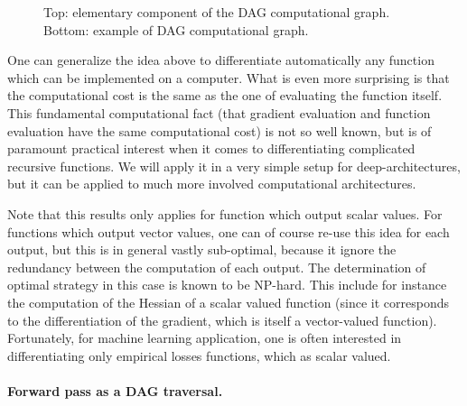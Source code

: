 \begin{figure}
\centering
{}
\hbox{}\vspace{3mm}\hbox{}
\caption{\label{fig-dag-example}
Top: elementary component of the DAG computational graph. 
Bottom: example of DAG computational graph.
}
\end{figure}

One can generalize the idea above to differentiate automatically any function which can be implemented on a computer. What is even more surprising is that the computational cost is the same as the one of evaluating the function itself. This fundamental computational fact (that gradient evaluation and function evaluation have the same computational cost) is not so well known, but is of paramount practical interest when it comes to differentiating complicated recursive functions. We will apply it in a very simple setup for deep-architectures, but it can be applied to much more involved computational architectures. 

Note that this results only applies for function which output scalar values. For functions which output vector values, one can of course re-use this idea for each output, but this is in general vastly sub-optimal, because it ignore the redundancy between the computation of each output. The determination of optimal strategy in this case is known to be NP-hard. This include for instance the computation of the Hessian of a scalar valued function (since it corresponds to the differentiation of the gradient, which is itself a vector-valued function). Fortunately, for machine learning application, one is often interested in differentiating only empirical losses functions, which as scalar valued.

\paragraph{Forward pass as a DAG traversal.}

